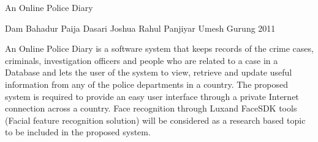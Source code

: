  \begin{conf-abstract}[]
{An Online Police Diary}

{ Dam Bahadur Paija
  Dasari Joshua
  Rahul Panjiyar
  Umesh Gurung 
}
{ 2011 }

      An Online Police Diary is a software system that keeps records of the crime cases, criminals, investigation officers and people who are related to a case in a Database and lets the user of the system to view, retrieve and update useful information from any of the police departments in a country. The proposed system is required to provide an easy user interface through a private Internet connection across a country. Face recognition through Luxand FaceSDK tools (Facial feature recognition solution) will be considered as a research based topic to be included in the proposed system. 
  \end{conf-abstract}